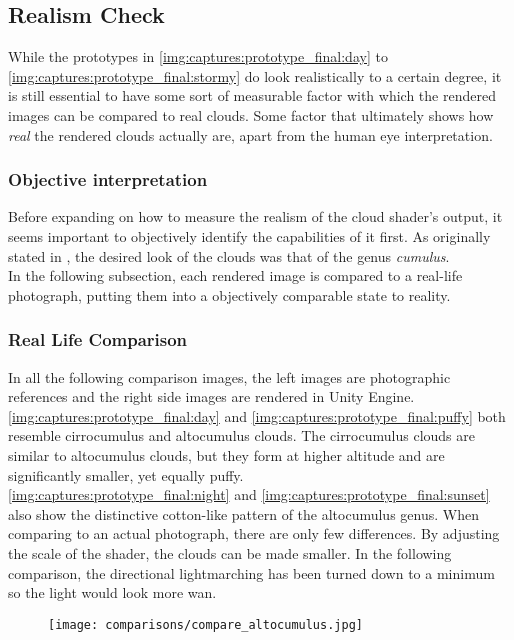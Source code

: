 \clearpage
\subsection{Realism Check}
\label{section:prototypes:realismcheck}
While the prototypes in \autoref{img:captures:prototype_final:day} to \autoref{img:captures:prototype_final:stormy} do look realistically to a certain degree, it is still essential to have some sort of measurable factor with which the rendered images can be compared to real clouds.
Some factor that ultimately shows how \textit{real} the rendered clouds actually are, apart from the human eye interpretation.

\subsubsection{Objective interpretation}
Before expanding on how to measure the realism of the cloud shader's output, it seems important to objectively identify the capabilities of it first.
As originally stated in , the desired look of the clouds was that of the genus \textit{cumulus}.
\\
In the following subsection, each rendered image is compared to a real-life photograph, putting them into a objectively comparable state to reality.

\clearpage
\subsubsection{Real Life Comparison}
In all the following comparison images, the left images are photographic references and the right side images are rendered in Unity Engine.
\emptyline
\autoref{img:captures:prototype_final:day} and \autoref{img:captures:prototype_final:puffy} both resemble cirrocumulus and altocumulus clouds.
The cirrocumulus clouds are similar to altocumulus clouds, but they form at higher altitude and are significantly smaller, yet equally puffy.
\\
\autoref{img:captures:prototype_final:night} and \autoref{img:captures:prototype_final:sunset} also show the distinctive cotton-like pattern of the altocumulus genus.
When comparing to an actual photograph, there are only few differences.
\emptyline
By adjusting the scale of the shader, the clouds can be made smaller. In the following comparison, the directional \gls{lightmarching} has been turned down to a minimum so the light would look more wan. 

\begin{figure}[H]
    \centering
    \texttt{[image: comparisons/compare\_altocumulus.jpg]}
    \label{img:comparisons:altocumulus}
\end{figure}

